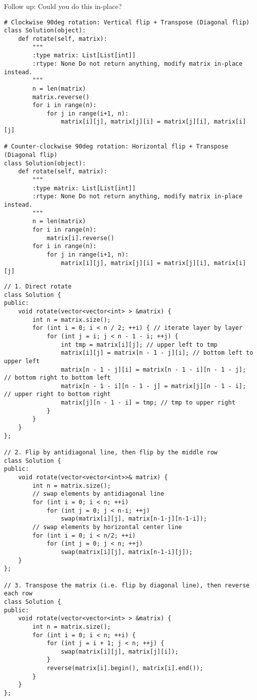 Follow up: Could you do this in-place?\\

\begin{lstlisting}
# Clockwise 90deg rotation: Vertical flip + Transpose (Diagonal flip)
class Solution(object):
    def rotate(self, matrix):
        """
        :type matrix: List[List[int]]
        :rtype: None Do not return anything, modify matrix in-place instead.
        """
        n = len(matrix)
        matrix.reverse()
        for i in range(n):
            for j in range(i+1, n):
                matrix[i][j], matrix[j][i] = matrix[j][i], matrix[i][j]
                
# Counter-clockwise 90deg rotation: Horizontal flip + Transpose (Diagonal flip)
class Solution(object):
    def rotate(self, matrix):
        """
        :type matrix: List[List[int]]
        :rtype: None Do not return anything, modify matrix in-place instead.
        """
        n = len(matrix)
        for i in range(n):
            matrix[i].reverse()
        for i in range(n):
            for j in range(i+1, n):
                matrix[i][j], matrix[j][i] = matrix[j][i], matrix[i][j]             
\end{lstlisting}

\begin{lstlisting}
// 1. Direct rotate
class Solution {
public:
    void rotate(vector<vector<int> > &matrix) {
        int n = matrix.size();
        for (int i = 0; i < n / 2; ++i) { // iterate layer by layer
            for (int j = i; j < n - 1 - i; ++j) {
                int tmp = matrix[i][j]; // upper left to tmp
                matrix[i][j] = matrix[n - 1 - j][i]; // bottom left to upper left
                matrix[n - 1 - j][i] = matrix[n - 1 - i][n - 1 - j]; // bottom right to bottom left
                matrix[n - 1 - i][n - 1 - j] = matrix[j][n - 1 - i]; // upper right to bottom right
                matrix[j][n - 1 - i] = tmp; // tmp to upper right
            }
        }
    }
};

// 2. Flip by antidiagonal line, then flip by the middle row
class Solution {
public:
    void rotate(vector<vector<int>>& matrix) {
        int n = matrix.size();
        // swap elements by antidiagonal line
        for (int i = 0; i < n; ++i)
            for (int j = 0; j < n-i; ++j)
                swap(matrix[i][j], matrix[n-1-j][n-1-i]);
        // swap elements by horizontal center line        
        for (int i = 0; i < n/2; ++i)
            for (int j = 0; j < n; ++j)
                swap(matrix[i][j], matrix[n-1-i][j]);
    }
};

// 3. Transpose the matrix (i.e. flip by diagonal line), then reverse each row
class Solution {
public:
    void rotate(vector<vector<int> > &matrix) {
        int n = matrix.size();
        for (int i = 0; i < n; ++i) {
            for (int j = i + 1; j < n; ++j) {
                swap(matrix[i][j], matrix[j][i]);
            }
            reverse(matrix[i].begin(), matrix[i].end());
        }
    }
};
\end{lstlisting}


